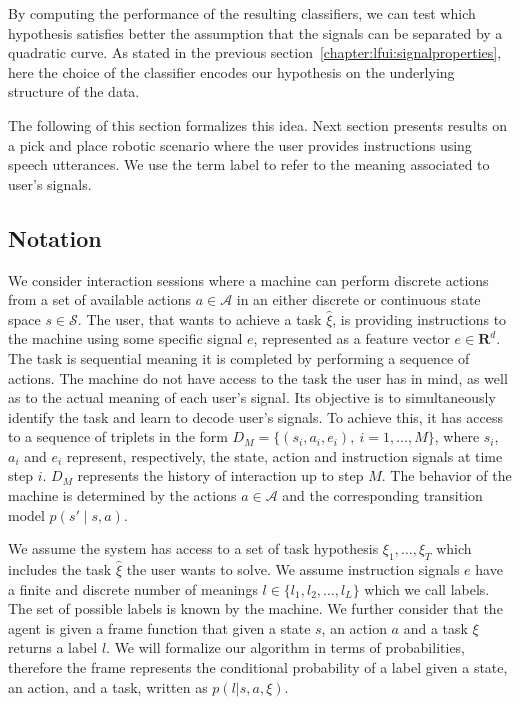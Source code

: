 By computing the performance of the resulting classifiers, we can test which hypothesis satisfies better the assumption that the signals can be separated by a quadratic curve. As stated in the previous section~\ref{chapter:lfui:signalproperties}, here the choice of the classifier encodes our hypothesis on the underlying structure of the data.

The following of this section formalizes this idea. Next section presents results on a pick and place robotic scenario where the user provides instructions using speech utterances. We use the term label to refer to the meaning associated to user's signals.

\subsection{Notation}

We consider interaction sessions where a machine can perform discrete actions from a set of available actions $a \in \mathcal{A}$ in an either discrete or continuous state space $s \in \mathcal{S}$. The user, that wants to achieve a task $\hat{\xi}$, is providing instructions to the machine using some specific signal $e$, represented as a feature vector  $e \in \mathbf{R}^d$. The task is sequential meaning it is completed by performing a sequence of actions. The machine do not have access to the task the user has in mind, as well as to the actual meaning of each user's signal. Its objective is to simultaneously identify the task and learn to decode user's signals. To achieve this, it has access to a sequence of triplets in the form $D_M = \{(s_i, a_i, e_i),\ i = 1,\ldots,M\}$, where $s_i$, $a_i$ and $e_i$ represent, respectively, the state, action and instruction signals at time step $i$. $D_M$ represents the history of interaction up to step $M$. The behavior of the machine is determined by the actions $a\in\mathcal{A}$ and the corresponding transition model $p(s'\mid s,a)$.

We assume the system has access to a set of task hypothesis $\xi_1,\ldots,\xi_T$ which includes the task $\hat{\xi}$ the user wants to solve. We assume instruction signals $e$ have a finite and discrete number of meanings $l \in \{l_1, l_2, \ldots, l_L\}$ which we call labels. The set of possible labels is known by the machine. We further consider that the agent is given a frame function that given a state $s$, an action $a$ and a task $\xi$ returns a label $l$. We will formalize our algorithm in terms of probabilities, therefore the frame represents the conditional probability of a label given a state, an action, and a task, written as $p(l | s, a, \xi)$.

